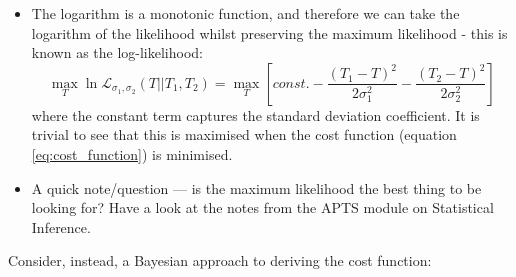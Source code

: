 \begin{itemize}
\begin{equation}
    \end{equation}
    \item The logarithm is a monotonic function, and therefore we can take the logarithm of the likelihood whilst preserving the maximum likelihood - this is known as the log-likelihood:
    \begin{equation}
        \max\limits_{T} \ln \mathcal{L}_{\sigma_1, \sigma_2} \left( T || T_1, T_2 \right) = 
        \max\limits_{T} \left[ const. - \frac{\left( T_1 - T \right)^2}{2 \sigma_1^2} - \frac{\left( T_2 - T \right)^2}{2 \sigma_2^2} \right]
    \end{equation}
    where the constant term captures the standard deviation coefficient.
    It is trivial to see that this is maximised when the cost function (equation \ref{eq:cost_function}) is minimised.
    \item A quick note/question --- is the maximum likelihood the best thing to be looking for? Have a look at the notes from the APTS module on Statistical Inference.
\end{itemize}
Consider, instead, a Bayesian approach to deriving the cost function:
